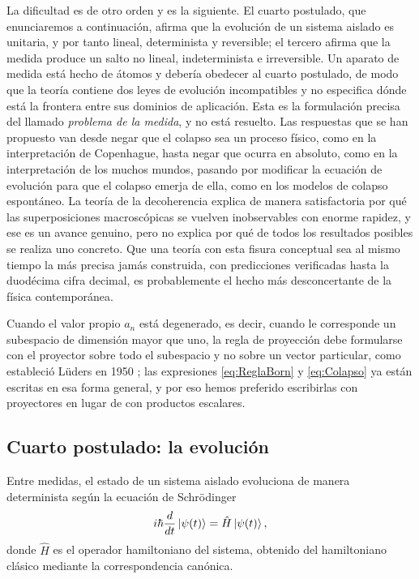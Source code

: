         La dificultad es de otro orden y es la siguiente. El cuarto postulado, que enunciaremos a continuación, afirma que la evolución de un sistema aislado es unitaria, y por tanto lineal, determinista y reversible; el tercero afirma que la medida produce un salto no lineal, indeterminista e irreversible. Un aparato de medida está hecho de átomos y debería obedecer al cuarto postulado, de modo que la teoría contiene dos leyes de evolución incompatibles y no especifica dónde está la frontera entre sus dominios de aplicación. Esta es la formulación precisa del llamado \textit{problema de la medida}, y no está resuelto. Las respuestas que se han propuesto van desde negar que el colapso sea un proceso físico, como en la interpretación de Copenhague, hasta negar que ocurra en absoluto, como en la interpretación de los muchos mundos, pasando por modificar la ecuación de evolución para que el colapso emerja de ella, como en los modelos de colapso espontáneo. La teoría de la decoherencia explica de manera satisfactoria por qué las superposiciones macroscópicas se vuelven inobservables con enorme rapidez, y ese es un avance genuino, pero no explica por qué de todos los resultados posibles se realiza uno concreto. Que una teoría con esta fisura conceptual sea al mismo tiempo la más precisa jamás construida, con predicciones verificadas hasta la duodécima cifra decimal, es probablemente el hecho más desconcertante de la física contemporánea.

        Cuando el valor propio $a_{n}$ está degenerado, es decir, cuando le corresponde un subespacio de dimensión mayor que uno, la regla de proyección debe formularse con el proyector sobre todo el subespacio y no sobre un vector particular, como estableció Lüders en 1950 \citep{luders1950zustandsanderung}; las expresiones \eqref{eq:ReglaBorn} y \eqref{eq:Colapso} ya están escritas en esa forma general, y por eso hemos preferido escribirlas con proyectores en lugar de con productos escalares.

    \subsection{Cuarto postulado: la evolución}

        \begin{Assumption}[Evolución]\label{sup:Evolucion}
            Entre medidas, el estado de un sistema aislado evoluciona de manera determinista según la ecuación de Schrödinger
            \begin{equation}\label{eq:SchrodingerPostulado}
                i\hbar\frac{d}{dt}\ket{\psi(t)} = \hat{H}\ket{\psi(t)},
            \end{equation}
            donde $\hat{H}$ es el operador hamiltoniano del sistema, obtenido del hamiltoniano clásico mediante la correspondencia canónica.
        \end{Assumption}

